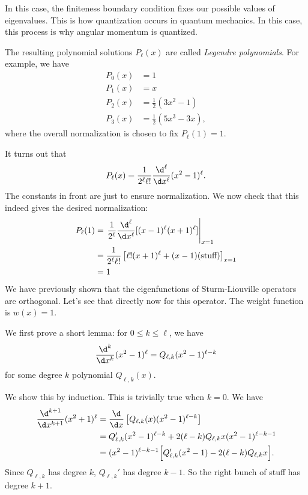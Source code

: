 \documentclass[a4paper]{article}
\begin{document}
In this case, the finiteness boundary condition fixes our possible values of eigenvalues. This is how quantization occurs in quantum mechanics. In this case, this process is why angular momentum is quantized.

The resulting polynomial solutions $P_\ell(x)$ are called \emph{Legendre polynomials}. For example, we have
\begin{align*}
  P_0(x) &= 1\\
  P_1(x) &= x\\
  P_2(x) &= \frac{1}{2}(3x^2 - 1)\\
  P_3(x) &= \frac{1}{2}(5x^3 - 3x),
\end{align*}
where the overall normalization is chosen to fix $P_\ell(1) = 1$.

It turns out that
\[
  P_\ell(x) = \frac{1}{2^\ell \ell!} \frac{\d^\ell}{\d x^\ell} (x^2 - 1)^\ell.
\]
The constants in front are just to ensure normalization. We now check that this indeed gives the desired normalization:
\begin{align*}
  P_\ell(1) &= \left.\frac{1}{2^\ell} \frac{\d^\ell}{\d x^\ell}[(x - 1)^\ell (x + 1)^\ell]\right|_{x = 1}\\
  &= \frac{1}{2^\ell \ell!} \left[\ell!(x + 1)^\ell + (x - 1)(\text{stuff})\right]_{x = 1}\\
  &= 1
\end{align*}
We have previously shown that the eigenfunctions of Sturm-Liouville operators are orthogonal. Let's see that directly now for this operator. The weight function is $w(x) = 1$.

We first prove a short lemma: for $0 \leq k \leq \ell$, we have
\[
  \frac{\d^k}{\d x^k}(x^2 - 1)^\ell = Q_{\ell, k}(x^2 - 1)^{\ell - k}
\]
for some degree $k$ polynomial $Q_{\ell, k}(x)$.

We show this by induction. This is trivially true when $k = 0$. We have
\begin{align*}
  \frac{\d^{k + 1}}{\d x^{k + 1}} (x^2 + 1)^\ell &= \frac{\d}{\d x}\left[Q_{\ell, k}(x) (x^2 - 1)^{\ell - k}\right] \\
  &= Q_{\ell, k}' (x^2 - 1)^{\ell - k} + 2(\ell - k)Q_{\ell, k} x(x^2 - 1)^{\ell - k - 1}\\
  &= (x^2 - 1)^{\ell - k - 1}\Big[Q_{\ell, k}'(x^2 - 1) - 2(\ell - k)Q_{\ell, k} x\Big].
\end{align*}
Since $Q_{\ell, k}$ has degree $k$, $Q_{\ell, k}'$ has degree $k - 1$. So the right bunch of stuff has degree $k + 1$.
\end{document}
